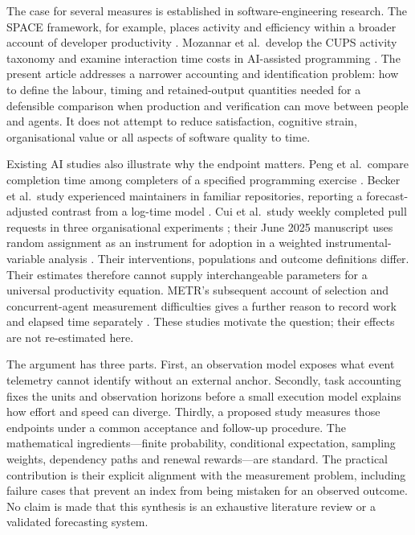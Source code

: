 \documentclass[11pt,a4paper]{amsart}
\theoremstyle{definition}
\theoremstyle{remark}
\begin{document}
The case for several measures is established in software-engineering research. The SPACE framework, for example, places activity and efficiency within a broader account of developer productivity \cite{forsgren2021}. Mozannar et al.\ develop the CUPS activity taxonomy and examine interaction time costs in AI-assisted programming \cite{mozannar2024}. The present article addresses a narrower accounting and identification problem: how to define the labour, timing and retained-output quantities needed for a defensible comparison when production and verification can move between people and agents. It does not attempt to reduce satisfaction, cognitive strain, organisational value or all aspects of software quality to time.

Existing AI studies also illustrate why the endpoint matters. Peng et al.\ compare completion time among completers of a specified programming exercise \cite{peng2023}. Becker et al.\ study experienced maintainers in familiar repositories, reporting a forecast-adjusted contrast from a log-time model \cite{becker2025}. Cui et al.\ study weekly completed pull requests in three organisational experiments \cite{cui2026}; their June 2025 manuscript uses random assignment as an instrument for adoption in a weighted instrumental-variable analysis \cite[Section 4.1 and Table 3]{cui2025manuscript}. Their interventions, populations and outcome definitions differ. Their estimates therefore cannot supply interchangeable parameters for a universal productivity equation. METR's subsequent account of selection and concurrent-agent measurement difficulties gives a further reason to record work and elapsed time separately \cite{metr2026}. These studies motivate the question; their effects are not re-estimated here.

The argument has three parts. First, an observation model exposes what event telemetry cannot identify without an external anchor. Secondly, task accounting fixes the units and observation horizons before a small execution model explains how effort and speed can diverge. Thirdly, a proposed study measures those endpoints under a common acceptance and follow-up procedure. The mathematical ingredients---finite probability, conditional expectation, sampling weights, dependency paths and renewal rewards---are standard. The practical contribution is their explicit alignment with the measurement problem, including failure cases that prevent an index from being mistaken for an observed outcome. No claim is made that this synthesis is an exhaustive literature review or a validated forecasting system.
\end{document}
